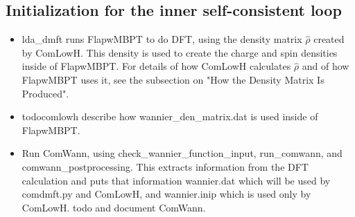 \documentclass[aps,prb,singlecolumn,preprintnumbers,amsmath,amssymb]{revtex4}
\begin{document}
\subsection{Initialization for the inner self-consistent loop}
\begin{itemize}
\item  lda\_dmft runs FlapwMBPT to do DFT, using the density matrix $\hat{\rho}$ created by ComLowH.   This density is used to create the charge and spin densities inside of FlapwMBPT.  For details of how ComLowH calculates $\hat{\rho}$  and of how FlapwMBPT uses it, see the subsection on "How the Density Matrix Is Produced".
\item todocomlowh describe how wannier\_den\_matrix.dat is used inside of FlapwMBPT.
\item Run ComWann, using check\_wannier\_function\_input, run\_comwann, and comwann\_postprocessing. This extracts information from the DFT calculation and puts that information wannier.dat which will be used by comdmft.py and ComLowH, and wannier.inip which is used only by ComLowH. todo  and document ComWann.
\end{itemize}



\end{document}
